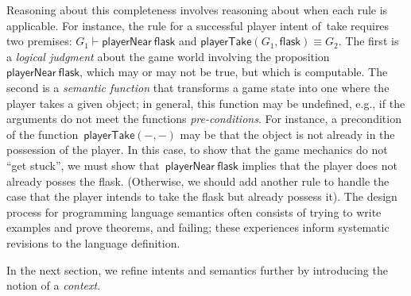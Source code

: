 Reasoning about this completeness involves reasoning about when each
rule is applicable.  
%
For instance, the rule for a successful player intent of~\textsf{take}
requires two premises:
$G_1 \vdash \textsf{playerNear}~\textsf{flask}$
and
$\textsf{playerTake}(G_1,\textsf{flask}) \equiv G_2$.
%
The first is a \emph{logical judgment} about the game world involving
the proposition~$\textsf{playerNear}~\textsf{flask}$, which may or
may not be true, but which is computable.
%
The second is a \emph{semantic function} that transforms a game state
into one where the player takes a given object; in general, this
function may be undefined, e.g., if the arguments do not meet the
functions \emph{pre-conditions}.
%
For instance, a precondition of the
function~$\textsf{playerTake}(-,-)$ may be that the object is not
already in the possession of the player.
%
In this case, to show that the game mechanics do not ``get stuck'', we
must show that~$\textsf{playerNear}~\textsf{flask}$ implies that the
player does not already posses the flask.
%
(Otherwise, we should add another rule to handle the case that the
player intends to take the flask but already possess it).
%
The design process for programming language semantics often consists
of trying to write examples and prove theorems, and failing; these
experiences inform systematic revisions to the language definition.

In the next section, we refine intents and semantics further by
introducing the notion of a \emph{context}.


